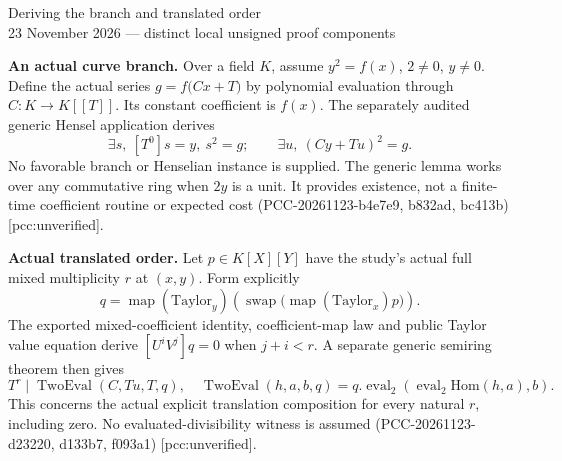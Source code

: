 \documentclass[10pt]{article}
\begin{document}
\begin{center}{\Large Deriving the branch and translated order}\\[3pt]
23 November 2026 --- distinct local unsigned proof components\end{center}
\textbf{An actual curve branch.} Over a field $K$, assume
$y^2=f(x)$, $2\ne0$, $y\ne0$. Define the actual series
$g=f\bigl(Cx+T\bigr)$ by polynomial evaluation through $C:K\to K[[T]]$.
Its constant coefficient is $f(x)$. The separately audited generic
Hensel application derives
\[
 \exists s,\ [T^0]s=y,\ s^2=g;
 \qquad \exists u,\ (Cy+Tu)^2=g.
\]
No favorable branch or Henselian instance is supplied. The generic
lemma works over any commutative ring when $2y$ is a unit. It provides
existence, not a finite-time coefficient routine or expected cost
(PCC-20261123-b4e7e9, b832ad, bc413b) [pcc:unverified].

\textbf{Actual translated order.} Let $p\in K[X][Y]$ have the study's
actual full mixed multiplicity $r$ at $(x,y)$. Form explicitly
\[
 q=\operatorname{map}(\mathrm{Taylor}_y)
 \left(\operatorname{swap}\bigl(\operatorname{map}(\mathrm{Taylor}_x)p\bigr)\right).
\]
The exported mixed-coefficient identity, coefficient-map law and
public Taylor value equation derive $[U^iV^j]q=0$ when $j+i<r$.
A separate generic semiring theorem then gives
\[
 T^r\mid \operatorname{TwoEval}(C,Tu,T,q),
 \quad\operatorname{TwoEval}(h,a,b,q)=q.\operatorname{eval}_2
       (\operatorname{eval}_2\mathrm{Hom}(h,a),b).
\]
This concerns the actual explicit translation composition for every
natural $r$, including zero. No evaluated-divisibility witness is
assumed (PCC-20261123-d23220, d133b7, f093a1) [pcc:unverified].
\end{document}
